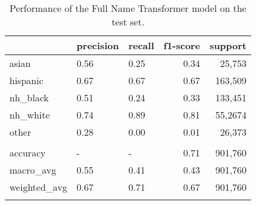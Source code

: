\documentclass[12pt, letterpaper]{article}
\begin{document}
\begin{table}[h!]
\centering
\caption{Performance of the Full Name Transformer model on the test set.}
\begin{tabular}{lllrr}
\hline
              & precision   & recall   &   f1-score &   support \\
\hline
 asian        & 0.56        & 0.25     &       0.34 &     25,753 \\
 hispanic     & 0.67        & 0.67     &       0.67 &    163,509 \\
 nh\_black     & 0.51        & 0.24     &       0.33 &    133,451 \\
 nh\_white     & 0.74        & 0.89     &       0.81 &    55,2674 \\
 other        & 0.28        & 0.00     &       0.01 &     26,373 \\
              &             &          &            &           \\
 accuracy     & -           & -        &       0.71 &    901,760 \\
 macro\_avg    & 0.55        & 0.41     &       0.43 &    901,760 \\
 weighted\_avg & 0.67        & 0.71     &       0.67 &    901,760 \\
\hline
\label{table:transformer_full_name}
\end{tabular}
\end{table}
\end{document}
